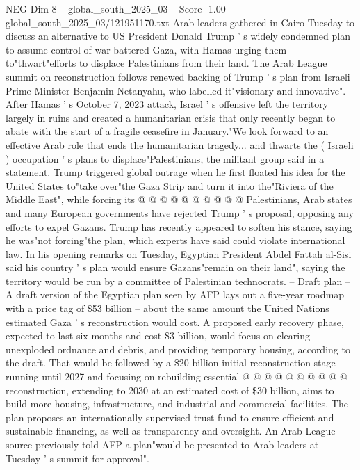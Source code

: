\begin{textsample}{NEG Dim 8 – global\_south\_2025\_03 – Score -1.00 – global\_south\_2025\_03/121951170.txt}  \label{ex:f8_neg_304}
Arab leaders gathered in Cairo Tuesday to discuss an alternative to US President Donald Trump ' s widely condemned plan to assume control of war-battered Gaza, with Hamas urging them to"thwart"efforts to displace Palestinians from their land.
The Arab League summit on reconstruction follows renewed backing of Trump ' s plan from Israeli Prime Minister Benjamin Netanyahu, who labelled it"visionary and innovative".
After Hamas ' s October 7, 2023 attack, Israel ' s offensive left the territory largely in ruins and created a humanitarian crisis that only recently began to abate with the start of a fragile ceasefire in January."We look forward to an effective Arab role that ends the humanitarian tragedy... and thwarts the ( Israeli ) occupation ' s plans to displace"Palestinians, the militant group said in a statement.
Trump triggered global outrage when he first floated his idea for the United States to"take over"the Gaza Strip and turn it into the"Riviera of the Middle East", while forcing its @ @ @ @ @ @ @ @ @ @ Palestinians, Arab states and many European governments have rejected Trump ' s proposal, opposing any efforts to expel Gazans.
Trump has recently appeared to soften his stance, saying he was"not forcing"the plan, which experts have said could violate international law.
In his opening remarks on Tuesday, Egyptian President Abdel Fattah al-Sisi said his country ' s plan would ensure Gazans"remain on their land", saying the territory would be run by a committee of Palestinian technocrats. -- Draft plan -- A draft version of the Egyptian plan seen by AFP lays out a five-year roadmap with a price tag of \$53 billion -- about the same amount the United Nations estimated Gaza ' s reconstruction would cost.
A proposed early recovery phase, expected to last six months and cost \$3 billion, would focus on clearing unexploded ordnance and debris, and providing temporary housing, according to the draft.
That would be followed by a \$20 billion initial reconstruction stage running until 2027 and focusing on rebuilding essential @ @ @ @ @ @ @ @ @ @ reconstruction, extending to 2030 at an estimated cost of \$30 billion, aims to build more housing, infrastructure, and industrial and commercial facilities.
The plan proposes an internationally supervised trust fund to ensure efficient and sustainable financing, as well as transparency and oversight.
An Arab League source previously told AFP a plan"would be presented to Arab leaders at Tuesday ' s summit for approval".

\end{textsample}
